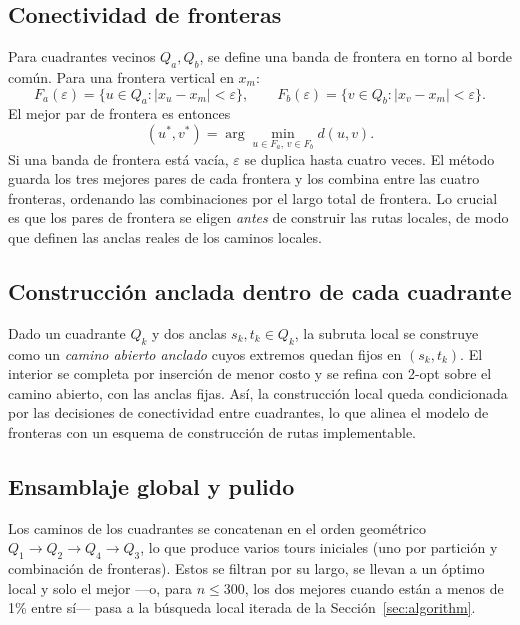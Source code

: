 \documentclass[runningheads]{llncs}
\begin{document}
\subsection{Conectividad de fronteras}

Para cuadrantes vecinos $Q_a,Q_b$, se define una banda de frontera en
torno al borde común. Para una frontera vertical en $x_m$:
\begin{equation}
F_a(\varepsilon)=\{u\in Q_a:|x_u-x_m|<\varepsilon\}, \qquad
F_b(\varepsilon)=\{v\in Q_b:|x_v-x_m|<\varepsilon\}.
\end{equation}
El mejor par de frontera es entonces
\begin{equation}
(u^*,v^*)=\arg\min_{u\in F_a,\,v\in F_b} d(u,v).
\label{eq:frontier}
\end{equation}
Si una banda de frontera está vacía, $\varepsilon$ se duplica hasta
cuatro veces. El método guarda los tres mejores pares de cada frontera y
los combina entre las cuatro fronteras, ordenando las combinaciones por
el largo total de frontera. Lo crucial es que los pares de frontera se
eligen \emph{antes} de construir las rutas locales, de modo que definen
las anclas reales de los caminos locales.

\subsection{Construcción anclada dentro de cada cuadrante}

Dado un cuadrante $Q_k$ y dos anclas $s_k,t_k\in Q_k$, la subruta local
se construye como un \emph{camino abierto anclado} cuyos extremos quedan
fijos en $(s_k,t_k)$. El interior se completa por inserción de menor
costo y se refina con 2-opt sobre el camino abierto, con las anclas
fijas. Así, la construcción local queda condicionada por las decisiones
de conectividad entre cuadrantes, lo que alinea el modelo de fronteras
con un esquema de construcción de rutas implementable.

\subsection{Ensamblaje global y pulido}

Los caminos de los cuadrantes se concatenan en el orden geométrico
$Q_1\!\to\!Q_2\!\to\!Q_4\!\to\!Q_3$, lo que produce varios tours
iniciales (uno por partición y combinación de fronteras). Estos se
filtran por su largo, se llevan a un óptimo local y solo el mejor ---o,
para $n\le 300$, los dos mejores cuando están a menos de 1\% entre sí---
pasa a la búsqueda local iterada de la Sección~\ref{sec:algorithm}.
\end{document}

